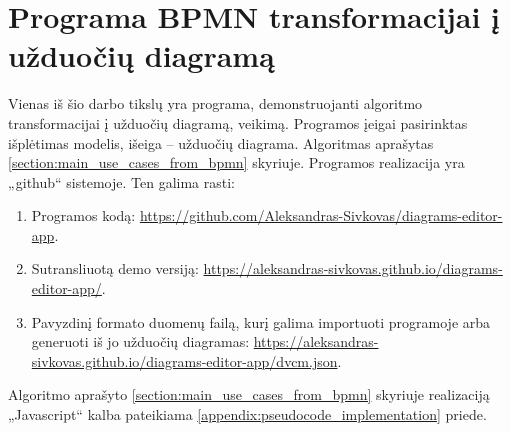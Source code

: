 \section{Programa BPMN transformacijai į užduočių diagramą}


Vienas iš šio darbo tikslų yra programa, demonstruojanti algoritmo \BPMN{} transformacijai į užduočių diagramą, veikimą. Programos įeigai pasirinktas \BPMN{} išplėtimas \DVCM{} modelis, išeiga – užduočių diagrama. Algoritmas aprašytas \ref{section:main_use_cases_from_bpmn} skyriuje. Programos realizacija yra „github“ sistemoje. Ten galima rasti:
\begin{enumerate}
  \item Programos kodą: \href{https://github.com/Aleksandras-Sivkovas/diagrams-editor-app}{https://github.com/Aleksandras-Sivkovas/diagrams-editor-app}.
  \item Sutransliuotą demo versiją: \href{https://aleksandras-sivkovas.github.io/diagrams-editor-app/}{https://aleksandras-sivkovas.github.io/diagrams-editor-app/}.
  \item Pavyzdinį \JSON{} formato duomenų failą, kurį galima importuoti programoje arba generuoti iš jo užduočių diagramas: \href{https://aleksandras-sivkovas.github.io/diagrams-editor-app/dvcm.json}{https://aleksandras-sivkovas.github.io/diagrams-editor-app/dvcm.json}.
\end{enumerate}
Algoritmo aprašyto \ref{section:main_use_cases_from_bpmn} skyriuje realizaciją „Javascript“ kalba pateikiama \ref{appendix:pseudocode_implementation} priede.




